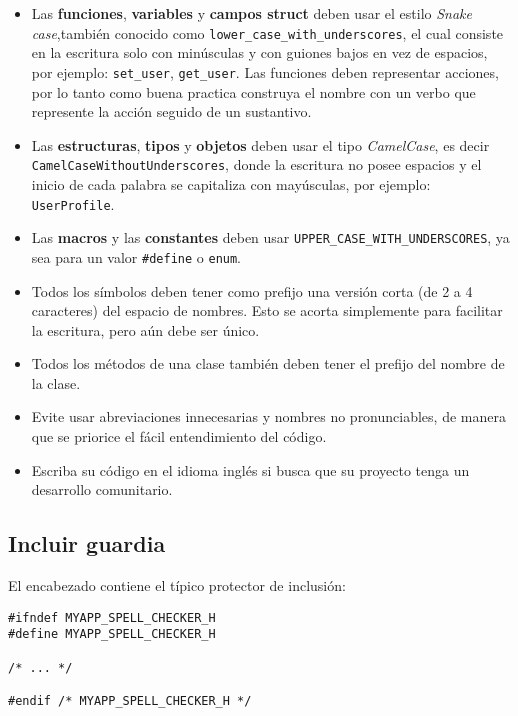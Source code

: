 \begin{itemize}
    \item Las \textbf{funciones}, \textbf{variables} y \textbf{campos struct} deben usar el estilo \emph{Snake case},\linebreak también conocido como  \lstinline{lower_case_with_underscores}, el cual consiste en la escritura solo con minúsculas y con guiones bajos en vez de espacios, por ejemplo: \lstinline{set_user}, \lstinline{get_user}. Las funciones deben representar acciones, por lo tanto como buena practica construya el nombre con un verbo que represente la acción seguido de un sustantivo.
    
    \item Las \textbf{estructuras}, \textbf{tipos} y \textbf{objetos} deben usar el tipo \emph{CamelCase}, es decir \linebreak \lstinline{CamelCaseWithoutUnderscores}, donde la escritura no posee espacios y el inicio de cada palabra se capitaliza con mayúsculas, por ejemplo: \lstinline{UserProfile}.
    
    \item Las \textbf{macros} y las \textbf{constantes} deben usar \lstinline{UPPER_CASE_WITH_UNDERSCORES}, ya sea para un valor \lstinline{#define} o \lstinline{enum}.
    
    \item Todos los símbolos deben tener como prefijo una versión corta (de 2 a 4 caracteres) del espacio de nombres. Esto se acorta simplemente para facilitar la escritura, pero aún debe ser único.
    
    \item Todos los métodos de una clase también deben tener el prefijo del nombre de la clase.
    
    \item Evite usar abreviaciones innecesarias y nombres no pronunciables, de manera que se priorice el fácil entendimiento del código.
    
    \item Escriba su código en el idioma inglés si busca que su proyecto tenga un desarrollo comunitario.
\end{itemize}

\subsection{Incluir guardia}
El encabezado contiene el típico protector de inclusión:

\begin{lstlisting}[style=GLib/GTK]
#ifndef MYAPP_SPELL_CHECKER_H
#define MYAPP_SPELL_CHECKER_H

/* ... */

#endif /* MYAPP_SPELL_CHECKER_H */
\end{lstlisting}

